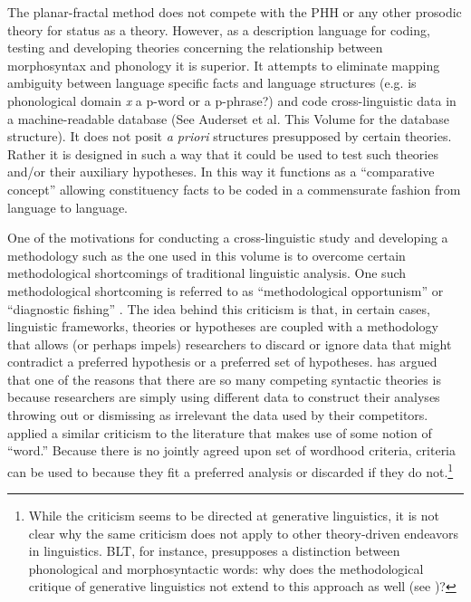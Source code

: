 \documentclass[output=paper,hidelinks]{langscibook}
\begin{document}
The planar-fractal method does not compete with the PHH or any other prosodic theory for status as a theory. However, as a description language for coding, testing and developing theories concerning the relationship between morphosyntax and phonology it is superior. It attempts to eliminate mapping ambiguity between language specific facts and language structures (e.g. is phonological domain \textit{x} a p-word or a p-phrase?) and code cross-linguistic data in a machine-readable database (See Auderset et al. This Volume for the database structure). It does not posit \textit{a priori} structures presupposed by certain theories. Rather it is designed in such a way that it could be used to test such theories and/or their auxiliary hypotheses. In this way it functions as a ``comparative concept'' \citep{haspelmath2010comparative, good2016linguistic} allowing constituency facts to be coded in a commensurate fashion from language to language.

One of the motivations for conducting a cross-linguistic study and developing a methodology such as the one used in this volume is to overcome certain methodological shortcomings of traditional linguistic analysis. One such methodological shortcoming is referred to as ``methodological opportunism'' or ``diagnostic fishing'' \citep{Croft2001, croft:tenunwarranted, haspelmathword:2011}. The idea behind this criticism is that, in certain cases, linguistic frameworks, theories or hypotheses are coupled with a methodology that allows (or perhaps impels) researchers to discard or ignore data that might contradict a preferred hypothesis or a preferred set of hypotheses. \citet{Croft2001} has argued that one of the reasons that there are so many competing syntactic theories is because researchers are simply using different data to construct their analyses throwing out or dismissing as irrelevant the data used by their competitors. \citet{haspelmathword:2011} applied a similar criticism to the literature that makes use of some notion of ``word.'' Because there is no jointly agreed upon set of wordhood criteria, criteria can be used to because they fit a preferred analysis or discarded if they do not.\footnote{While the criticism seems to be directed at generative linguistics, it is not clear why the same criticism does not apply to other theory-driven endeavors in linguistics. BLT, for instance, presupposes a distinction between phonological and morphosyntactic words: why does the methodological critique of generative linguistics not extend to this approach as well (see )?}
\end{document}
